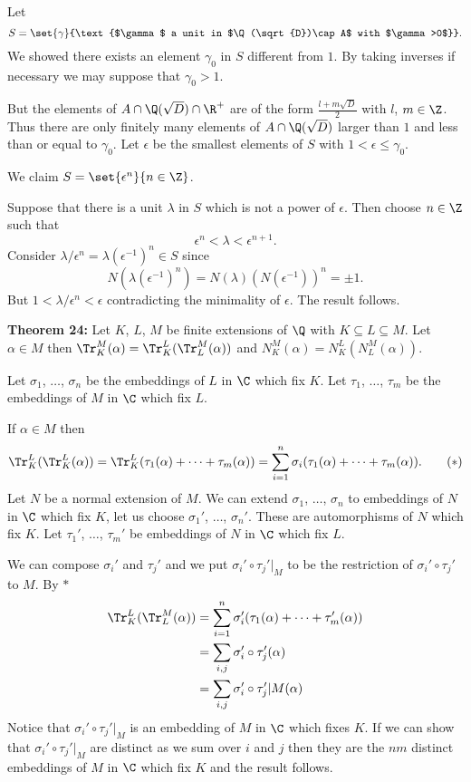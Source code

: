 Let
\[ S = \set{\gamma}{\text{$\gamma$ a unit in $\Q(\sqrt{D})\cap A$ with $\gamma>0$}} . \]
We showed there exists an element $\gamma_0$ in $S$ different from $1$.  By taking inverses if necessary we may suppose that $\gamma_0>1$.

But the elements of $A\cap\Q(\sqrt{D})\cap\R^+$ are of the form $\frac{l+m\sqrt{D}}{2}$ with $l$, $m\in\Z$.  Thus there are only finitely many elements of $A\cap\Q(\sqrt{D})$ larger than $1$ and less than or equal to $\gamma_0$.  Let $\epsilon$ be the smallest elements of $S$ with $1<\epsilon\leq\gamma_0$.

We claim $S=\set{\epsilon^n}{n\in\Z}$.

Suppose that there is a unit $\lambda$ in $S$ which is not a power of $\epsilon$.  Then choose $n\in\Z$ such that
\[ \epsilon^n < \lambda < \epsilon^{n+1} . \]
Consider $\lambda/\epsilon^n=\lambda(\epsilon^{-1})^n\in S$ since
\[ N(\lambda(\epsilon^{-1})^n) = N(\lambda)(N(\epsilon^{-1}))^n = \pm 1 . \]
But $1<\lambda/\epsilon^n<\epsilon$ contradicting the minimality of $\epsilon$.  The result follows.

\textbf{Theorem 24:} Let $K$, $L$, $M$ be finite extensions of $\Q$ with $K\subseteq L\subseteq M$.  Let $\alpha\in M$ then $\Tr_K^M(\alpha)=\Tr_K^L(\Tr_L^M(\alpha))$ and $N_K^M(\alpha)=N_K^L(N_L^M(\alpha))$.

Let $\sigma_1$, $\dotsc$, $\sigma_n$ be the embeddings of $L$ in $\C$ which fix $K$.  Let $\tau_1$, $\dotsc$, $\tau_m$ be the embeddings of $M$ in $\C$ which fix $L$.

If $\alpha\in M$ then
\[ \Tr_K^L(\Tr_K^L(\alpha)) = \Tr_K^L(\tau_1(\alpha)+\dotsb+\tau_m(\alpha)) = \sum_{i=1}^n\sigma_i(\tau_1(\alpha)+\dotsb+\tau_m(\alpha)) . \tag{$*$} \]
Let $N$ be a normal extension of $M$.  We can extend $\sigma_1$, $\dotsc$, $\sigma_n$ to embeddings of $N$ in $\C$ which fix $K$, let us choose $\sigma_1'$, $\dotsc$, $\sigma_n'$.  These are automorphisms of $N$ which fix $K$.  Let $\tau_1'$, $\dotsc$, $\tau_m'$ be embeddings of $N$ in $\C$ which fix $L$.

We can compose $\sigma_i'$ and $\tau_j'$ and we put $\sigma_i'\circ\tau_j'|_M$ to be the restriction of $\sigma_i'\circ\tau_j'$ to $M$.  By $*$
\begin{align*}
\Tr_K^L(\Tr_L^M(\alpha)) &= \sum_{i=1}^n\sigma_i'(\tau_1(\alpha)+\dotsb+\tau_m'(\alpha)) \\
&= \sum_{i,j}\sigma_i'\circ\tau_j'(\alpha) \\
&= \sum_{i,j}\sigma_i'\circ\tau_j'|M(\alpha)
\end{align*}
Notice that $\sigma_i'\circ\tau_j'|_M$ is an embedding of $M$ in $\C$ which fixes $K$.  If we can show that $\sigma_i'\circ\tau_j'|_M$ are distinct as we sum over $i$ and $j$ then they are the $nm$ distinct embeddings of $M$ in $\C$ which fix $K$ and the result follows.

